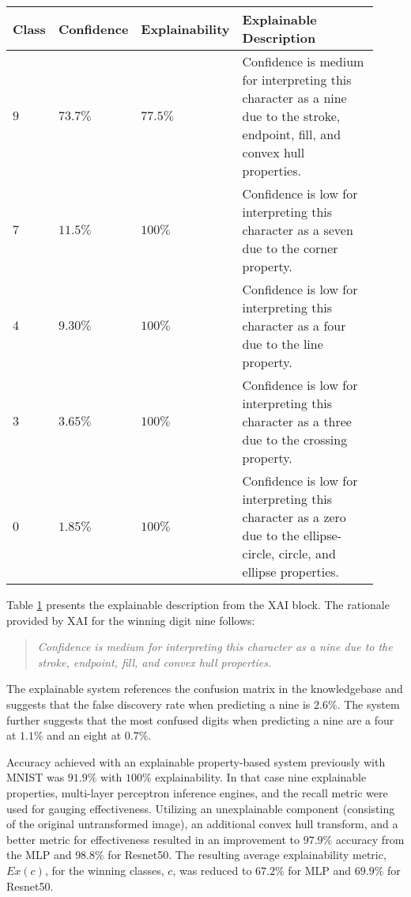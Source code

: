 \begin{table}[H]
    \renewcommand{\arraystretch}{1.3}
     \label{table:mnist_example3_explanation}
    \begin{tabular}{| m{0.06\linewidth} | m{0.14\linewidth} | m{0.17\linewidth} | m{0.55\linewidth} |}
    \hline
     Class & Confidence & Explainability & Explainable Description \\
    \hline \hline
    $9$ & $73.7\%$ & $77.5\%$ & Confidence is medium for interpreting this character as a nine due to the stroke, endpoint, fill, and convex hull properties. \\ 
    \hline
    $7$ & $11.5\%$ & $100\%$ & Confidence is low for interpreting this character as a seven due to the corner property. \\
    \hline
    $4$ & $9.30\%$ & $100\%$ & Confidence is low for interpreting this character as a four due to the line property. \\
    \hline
    $3$ & $3.65\%$ & $100\%$ & Confidence is low for interpreting this character as a three due to the crossing property. \\
    \hline
    $0$ & $1.85\%$ & $100\%$ & Confidence is low for interpreting this character as a zero due to the ellipse-circle, circle, and ellipse properties. \\
    \hline
    \end{tabular}
\end{table}

Table \ref{table:mnist_example3_explanation} presents the explainable description from the
XAI block.  The rationale provided by XAI for the winning digit nine follows:

\begin{quote}
    \textit{Confidence is medium for interpreting this character as a nine due to the stroke, endpoint, fill, and convex hull properties.}
\end{quote}

The explainable system references the confusion matrix in the knowledgebase and
suggests that the false discovery rate when predicting a nine is $2.6\%$. The
system further suggests that the most confused digits when predicting a nine are
a four at $1.1\%$ and an eight at $0.7\%$.

Accuracy achieved with an explainable property-based system previously with
MNIST was $91.9\%$ with $100\%$ explainability\cite{whitten21}.  In that case
nine explainable properties, multi-layer perceptron inference engines, and the
recall metric were used for gauging effectiveness. Utilizing an unexplainable
component (consisting of the original untransformed image), an additional convex
hull transform, and a better metric for effectiveness resulted in an improvement
to $97.9\%$ accuracy from the MLP and $98.8\%$ for Resnet50. The resulting
average explainability metric, $Ex(c)$, for the winning classes, $c$, was
reduced to $67.2$\% for MLP and $69.9\%$ for Resnet50.

